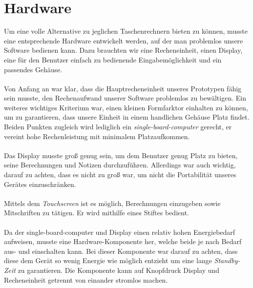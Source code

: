 \section{Hardware}
Um eine volle Alternative zu jeglichen Taschenrechnern bieten zu können, musste eine entsprechende Hardware entwickelt werden, auf der man problemlos unsere Software bedienen kann. Dazu brauchten wir eine Recheneinheit, einen Display, eine für den Benutzer einfach zu bedienende Eingabemöglichkeit und ein passendes Gehäuse.\\
\\
Von Anfang an war klar, dass die Hauptrecheneinheit unseres Prototypen fähig sein musste, den Rechenaufwand unserer Software problemlos zu bewältigen. Ein weiteres wichtiges Kriterium war, einen kleinen Formfarktor einhalten zu können, um zu garantieren, dass unsere Einheit in einem handlichen Gehäuse Platz findet. Beiden Punkten zugleich wird lediglich ein \textit{single-board-computer} gerecht, er vereint hohe Rechenleistung mit minimalem Platzaufkommen.\\
\\
Das Display musste groß genug sein, um dem Benutzer genug Platz zu bieten, seine Berechnungen und Notizen durchzuführen. Allerdings war auch wichtig, darauf zu achten, dass es nicht zu groß war, um nicht die Portabilität unseres Gerätes einzuschränken.\\
\\
Mittels dem \textit{Touchscreen} ist es möglich, Berechnungen einzugeben sowie Mitschriften zu tätigen. Er wird mithilfe eines Stiftes bedient.\\
\\
Da der single-board-computer und Display einen relativ hohen Energiebedarf aufweisen, musste eine Hardware-Komponente her, welche beide je nach Bedarf aus- und einschalten kann. Bei dieser Komponente war darauf zu achten, dass diese dem Gerät so wenig Energie wie möglich entzieht um eine lange \textit{Standby-Zeit} zu garantieren. Die Komponente kann auf Knopfdruck Display und Recheneinheit getrennt von einander stromlos machen.\\

